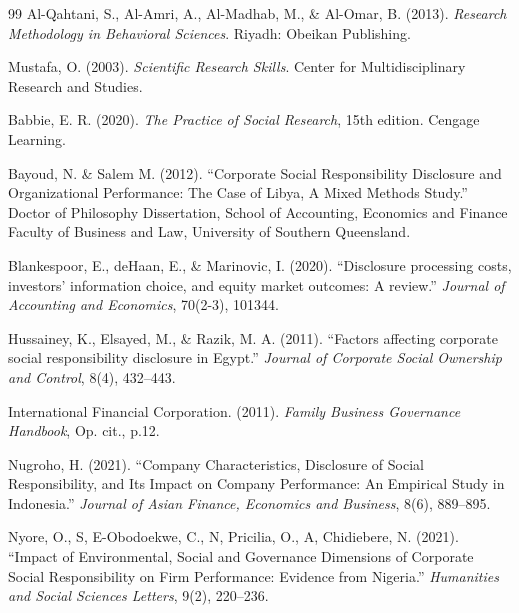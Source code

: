 \documentclass[10pt]{NSP1}
\begin{document}
\begin{thebibliography}{99}
Al-Qahtani, S., Al-Amri, A., Al-Madhab, M., \& Al-Omar, B. (2013). \emph{Research Methodology in Behavioral Sciences}. Riyadh: Obeikan Publishing.

Mustafa, O. (2003). \emph{Scientific Research Skills}. Center for Multidisciplinary Research and Studies.

Babbie, E. R. (2020). \emph{The Practice of Social Research}, 15th edition. Cengage Learning.

Bayoud, N. \& Salem M. (2012). ``Corporate Social Responsibility Disclosure and Organizational Performance: The Case of Libya, A Mixed Methods Study.'' Doctor of Philosophy Dissertation, School of Accounting, Economics and Finance Faculty of Business and Law, University of Southern Queensland.

Blankespoor, E., deHaan, E., \& Marinovic, I. (2020). ``Disclosure processing costs, investors' information choice, and equity market outcomes: A review.'' \emph{Journal of Accounting and Economics}, 70(2-3), 101344.

Hussainey, K., Elsayed, M., \& Razik, M. A. (2011). ``Factors affecting corporate social responsibility disclosure in Egypt.'' \emph{Journal of Corporate Social Ownership and Control}, 8(4), 432--443.

International Financial Corporation. (2011). \emph{Family Business Governance Handbook}, Op. cit., p.12.

Nugroho, H. (2021). ``Company Characteristics, Disclosure of Social Responsibility, and Its Impact on Company Performance: An Empirical Study in Indonesia.'' \emph{Journal of Asian Finance, Economics and Business}, 8(6), 889--895.

Nyore, O., S, E-Obodoekwe, C., N, Pricilia, O., A, Chidiebere, N. (2021). ``Impact of Environmental, Social and Governance Dimensions of Corporate Social Responsibility on Firm Performance: Evidence from Nigeria.'' \emph{Humanities and Social Sciences Letters}, 9(2), 220--236.

\end{thebibliography}
\end{document}
